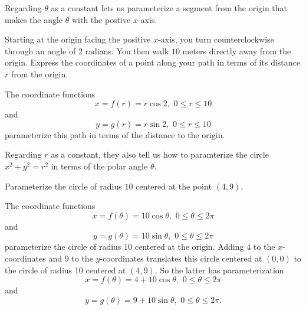 \documentclass{ximera}
\begin{document}
Regarding $\theta$ as a constant lets us parameterize a segment from the origin that makes the angle $\theta$ with the postive $x$-axis.

\begin{example} \label{Ex11:Cosine}
Starting at the origin facing the positive $x$-axis, you turn counterclockwise through an angle of 2 radians. You then walk $10$ meters directly away from the origin. Express the coordinates of a point along your path in terms of its distance $r$ from the origin.

\begin{explanation}
The coordinate functions
\[
     x = f(r) = r\cos 2  , \,\,   0\leq r \leq 10
\]
and
\[
  y =g(r) = r \sin 2  , \,\,   0\leq r \leq 10
\]
parameterize this path in terms of the distance to the origin.
\end{explanation}
\end{example}



Regarding $r$ as a constant, they also tell us how to paramterize the circle $x^2 + y^2 = r^2$ in terms of the polar angle $\theta$.

\begin{example} \label{Ex10:Cosine}
Parameterize the circle of radius $10$ centered at the point $(4,9)$.

\begin{explanation}
The coordinate functions
\[
     x = f(\theta) = 10\cos \theta  , \, \,   0\leq \theta \leq 2\pi
\]
and
\[
  y =g(\theta) = 10\sin \theta   , \,\, 0\leq \theta \leq 2\pi
\]
parameterize the circle of radius $10$ centered at the origin. Adding $4$ to the $x$-coordinates and $9$ to the $y$-coordinates translates this circle centered at $(0,0)$ to the circle of radius 10 centered at $(4,9)$. So the latter has parameterization
\[
     x = f(\theta) = 4+ 10\cos \theta ,  \,\,  0\leq \theta \leq 2\pi
\]
and
\[
  y = g(\theta) = 9 + 10\sin \theta  , \,\,   0\leq \theta \leq 2\pi .
\]
\end{explanation}
\end{example}
\end{document}
